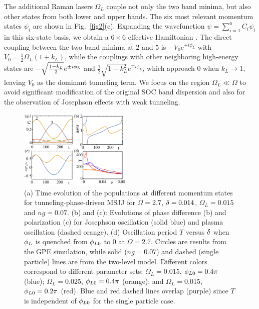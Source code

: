 \documentclass[twocolumn,prl,floatfix,citeautoscript,nofootinbib,superscriptaddress]{revtex4}
\begin{document}
The additional Raman lasers $\Omega _{L}$ couple not only the two band
minima, but also other states from both lower and upper bands. The six most
relevant momentum states $\psi _{i}$ are shown in Fig.~\ref{fig2}(c).
Expanding the wavefunction $\psi =\sum_{i=1}^{6}C_{i}\psi _{i}$ in this
six-state basis, we obtain a $6\times 6$ effective Hamiltonian \cite{Supp}.
The direct coupling between the two band minima at $2$ and $5$ is $%
-V_{0}e^{\mp i\phi _{L}}$ with $V_{0}=\frac{1}{2}\Omega _{L}(1+k_{L})$,
while the couplings with other neighboring high-energy states are $-\sqrt{%
\frac{1-k_{L}}{2}}e^{\pm i\phi _{L}}$ and $\frac{1}{2}\sqrt{1-k_{L}^{2}}%
e^{\mp i\phi _{L}} $, which approach $0$ when $k_{L}\rightarrow 1$, leaving $%
V_{0}$ as the dominant tunneling term. We focus on the region $\Omega
_{L}\ll \Omega $ to avoid significant modification of the original SOC band
dispersion and also for the observation of Josephson effects with weak
tunneling.

\begin{figure}[t]
\centering
\includegraphics[width=0.48\textwidth]{Fig3.pdf}
\caption{(a) Time evolution of the populations at different momentum states
for tunneling-phase-driven MSJJ for $\Omega =2.7$, $\protect\delta =0.014$, $%
\Omega _{L}=0.015$ and $ng=0.07$. (b) and (c): Evolutions of phase
difference (b) and polarization (c) for Josephson oscillation (solid blue)
and plasma oscillation (dashed orange). (d) Oscillation period $T$ versus $%
\protect\delta $ when $\protect\phi _{L}$ is quenched from $\protect\phi %
_{L0}$ to $0$ at $\Omega =2.7$. Circles are results from the GPE simulation,
while solid ($ng=0.07$) and dashed (single particle) lines are from the
two-level model. Different colors correspond to different parameter sets: $%
\Omega _{L}=0.015$, $\protect\phi _{L0}=0.4\protect\pi $ (blue); $\Omega
_{L}=0.025$, $\protect\phi _{L0}=0.4\protect\pi $ (orange); and $\Omega
_{L}=0.015$, $\protect\phi _{L0}=0.2\protect\pi $ (red). Blue and red dashed
lines overlap (purple) since $T$ is independent of $\protect\phi _{L0}$ for
the single particle case.}
\label{fig3}
\end{figure}
\end{document}
